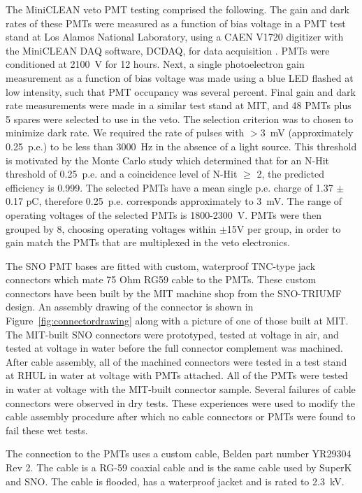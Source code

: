 \documentclass[review,number,sort&compress]{elsarticle}
\begin{document}
The MiniCLEAN veto PMT testing comprised the following.  The gain and
dark rates of these PMTs were measured as a function of bias voltage
in a PMT test stand at Los Alamos National Laboratory, using a CAEN
V1720 digitizer with the MiniCLEAN DAQ software, DCDAQ, for data
acquisition \cite{ref:gastler_thesis}. PMTs were conditioned at 2100~V
for 12 hours. Next, a single photoelectron gain measurement as a
function of bias voltage was made using a blue LED flashed at low
intensity, such that PMT occupancy was several percent. Final gain and
dark rate measurements were made in a similar test stand at MIT, and
48 PMTs plus 5 spares were selected to use in the veto. The selection
criterion was to chosen to minimize dark rate.  We required the rate
of pulses with $>$3~mV (approximately 0.25~p.e.) to be less than
3000~Hz in the absence of a light source.  This threshold is motivated
by the Monte Carlo study which determined that for an N-Hit threshold
of 0.25~p.e. and a coincidence level of N-Hit $\ge$ 2, the predicted
efficiency is 0.999.  The selected PMTs have a mean single p.e. charge
of 1.37 $\pm$0.17 pC, therefore 0.25~p.e. corresponds approximately to
3~mV.  The range of operating voltages of the selected PMTs is
1800-2300~V.  PMTs were then grouped by 8, choosing operating voltages
within $\pm$15V per group, in order to gain match the PMTs that are
multiplexed in the veto electronics.

The SNO PMT bases are fitted with custom, waterproof TNC-type jack
connectors which mate 75 Ohm RG59 cable to the PMTs. These custom
connectors have been built by the MIT machine shop from the SNO-TRIUMF
design. An assembly drawing of the connector is shown in
Figure~\ref{fig:connectordrawing} along with a picture of one of those
built at MIT. The MIT-built SNO
connectors were prototyped, tested at voltage in air, and tested at
voltage in water before the full connector complement was machined.
After cable assembly, all of the machined connectors were tested in
a test stand at RHUL in water at voltage with PMTs attached. All of the
PMTs were tested in water at voltage with the MIT-built connector
sample. Several failures of cable connectors were observed in dry
tests. These experiences were used to modify the cable assembly
procedure after which no cable connectors or PMTs were found to fail
these wet tests.


The connection to the PMTs uses a custom cable, Belden part number YR29304 Rev 2. The cable is a
RG-59 coaxial cable and is the same cable used by SuperK and SNO.
The cable is flooded, has a waterproof jacket and is rated to 2.3~kV.
\end{document}

